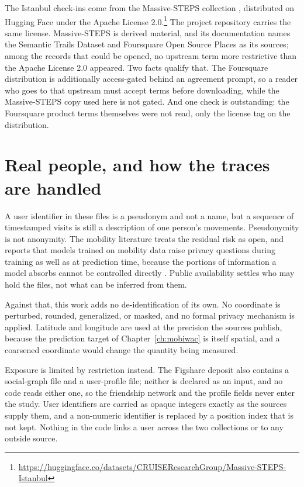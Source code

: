The Istanbul check-ins come from the Massive-STEPS collection
\cite{wongso2025massivesteps}, distributed on Hugging Face under the Apache License
2.0.\footnote{\url{https://huggingface.co/datasets/CRUISEResearchGroup/Massive-STEPS-Istanbul}}
The project repository carries the same license. Massive-STEPS is derived material, and
its documentation names the Semantic Trails Dataset and Foursquare Open Source Places as
its sources; among the records that could be opened, no upstream term more restrictive
than the Apache License 2.0 appeared. Two facts qualify that. The Foursquare
distribution is additionally access-gated behind an agreement prompt, so a reader who goes
to that upstream must accept terms before downloading, while the Massive-STEPS copy used
here is not gated. And one check is outstanding: the Foursquare product terms themselves
were not read, only the license tag on the distribution.

\section{Real people, and how the traces are handled}

A user identifier in these files is a pseudonym and not a name, but a sequence of
timestamped visits is still a description of one person's movements. Pseudonymity is not
anonymity. The mobility literature treats the residual risk as open, and reports that
models trained on mobility data raise privacy questions during training as well as at
prediction time, because the portions of information a model absorbs cannot be
controlled directly \cite{luca2021mobilitysurvey}. Public availability settles who may
hold the files, not what can be inferred from them.

Against that, this work adds no de-identification of its own. No coordinate is
perturbed, rounded, generalized, or masked, and no formal privacy mechanism is
applied. Latitude and
longitude are used at the precision the sources publish, because the prediction target
of Chapter~\ref{ch:mobiwac} is itself spatial, and a coarsened coordinate would change
the quantity being measured.

Exposure is limited by restriction instead. The Figshare deposit also contains a
social-graph file and a user-profile file; neither is declared as an input, and no code
reads either one, so the friendship network and the profile fields never enter the
study. User identifiers are carried as opaque integers exactly as the sources supply
them, and a non-numeric identifier is replaced by a position index that is not kept.
Nothing in the code links a user across the two collections or to any outside source.

